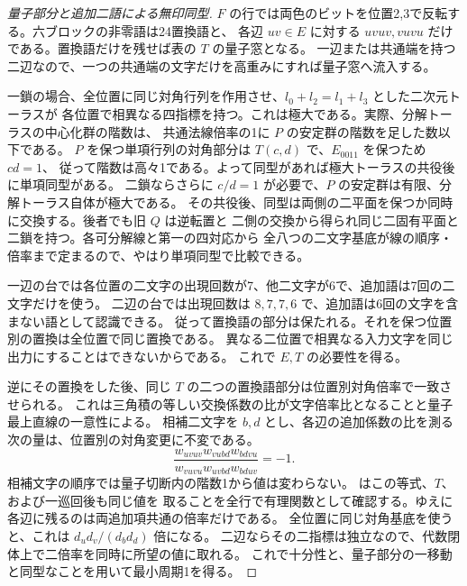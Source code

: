 \begin{proof}[量子部分と追加二語による無印同型]
$F$ の行では両色のビットを位置2,3で反転する。六ブロックの非零語は24置換語と、
各辺 $uv\in E$ に対する $uvuv,vuvu$ だけである。置換語だけを残せば表の $T$ の量子窓となる。
一辺または共通端を持つ二辺なので、一つの共通端の文字だけを高重みにすれば量子窓へ流入する。

一鎖の場合、全位置に同じ対角行列を作用させ、$l_0+l_2=l_1+l_3$ とした二次元トーラスが
各位置で相異なる四指標を持つ。これは極大である。実際、分解トーラスの中心化群の階数は、
共通法線倍率の1に $P$ の安定群の階数を足した数以下である。
$P$ を保つ単項行列の対角部分は $T(c,d)$ で、$E_{0011}$ を保つため $cd=1$、
従って階数は高々1である。よって同型があれば極大トーラスの共役後に単項同型がある。
二鎖ならさらに $c/d=1$ が必要で、$P$ の安定群は有限、分解トーラス自体が極大である。
その共役後、同型は両側の二平面を保つか同時に交換する。後者でも旧 $Q$ は逆転置と
二側の交換から得られ同じ二固有平面と二鎖を持つ。各可分解線と第一の四対応から
全八つの二文字基底が線の順序・倍率まで定まるので、やはり単項同型で比較できる。

一辺の台では各位置の二文字の出現回数が7、他二文字が6で、追加語は7回の二文字だけを使う。
二辺の台では出現回数は $8,7,7,6$ で、追加語は6回の文字を含まない語として認識できる。
従って置換語の部分は保たれる。それを保つ位置別の置換は全位置で同じ置換である。
異なる二位置で相異なる入力文字を同じ出力にすることはできないからである。
これで $E,T$ の必要性を得る。

逆にその置換をした後、同じ $T$ の二つの置換語部分は位置別対角倍率で一致させられる。
これは三角積の等しい交換係数の比が文字倍率比となることと量子最上直線の一意性による。
相補二文字を $b,d$ とし、各辺の追加係数の比を測る次の量は、位置別の対角変更に不変である。
\[
   \frac{w_{uvuv} w_{vubd} w_{bdvu}}{w_{vuvu} w_{uvbd} w_{bduv}}=-1.
\]
相補文字の順序では量子切断内の階数1から値は変わらない。
 はこの等式、$T$、および一巡回後も同じ値を
取ることを全行で有理関数として確認する。ゆえに各辺に残るのは両追加項共通の倍率だけである。
全位置に同じ対角基底を使うと、これは $d_ud_v/(d_bd_d)$ 倍になる。
二辺ならその二指標は独立なので、代数閉体上で二倍率を同時に所望の値に取れる。
これで十分性と、量子部分の一移動と同型なことを用いて最小周期1を得る。
\end{proof}

